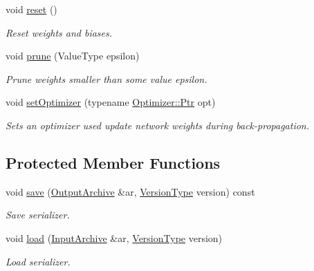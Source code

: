 \begin{DoxyCompactItemize}
void \hyperlink{classffnn_1_1layer_1_1_sparsely_connected_a084e685f9e14b926d6cc6fb973775415}{reset} ()
\begin{DoxyCompactList}\small\item\em Reset weights and biases. \end{DoxyCompactList}\item 
void \hyperlink{classffnn_1_1layer_1_1_sparsely_connected_a5ad877d8a61e22e66b040915fe5cb045}{prune} (Value\-Type epsilon)
\begin{DoxyCompactList}\small\item\em Prune weights smaller than some value epsilon. \end{DoxyCompactList}\item 
void \hyperlink{classffnn_1_1layer_1_1_sparsely_connected_a1d6abf2925da812b4fb88a140ec60b63}{set\-Optimizer} (typename \hyperlink{classffnn_1_1optimizer_1_1_optimizer_ac03e7181934bf0c12a97fc67a60484ab}{Optimizer\-::\-Ptr} opt)
\begin{DoxyCompactList}\small\item\em Sets an optimizer used update network weights during back-\/propagation. \end{DoxyCompactList}\end{DoxyCompactItemize}
\subsection*{Protected Member Functions}
\begin{DoxyCompactItemize}
\item 
void \hyperlink{classffnn_1_1layer_1_1_sparsely_connected_aa8ae358e7cf06b58f3d33be2851d0260}{save} (\hyperlink{classffnn_1_1traits_1_1_serializable_a08d986df75d363fa79506d4f6045cb9f}{Output\-Archive} \&ar, \hyperlink{classffnn_1_1traits_1_1_serializable_a08924b3b7d20cb3cb6eafe517d4f7b30}{Version\-Type} version) const 
\begin{DoxyCompactList}\small\item\em Save serializer. \end{DoxyCompactList}\item 
void \hyperlink{classffnn_1_1layer_1_1_sparsely_connected_a0996cd78dc2f76cab36fac2ec5c8f323}{load} (\hyperlink{classffnn_1_1traits_1_1_serializable_a6e626759259f8f370dd4303b4441a234}{Input\-Archive} \&ar, \hyperlink{classffnn_1_1traits_1_1_serializable_a08924b3b7d20cb3cb6eafe517d4f7b30}{Version\-Type} version)
\begin{DoxyCompactList}\small\item\em Load serializer. \end{DoxyCompactList}\end{DoxyCompactItemize}

